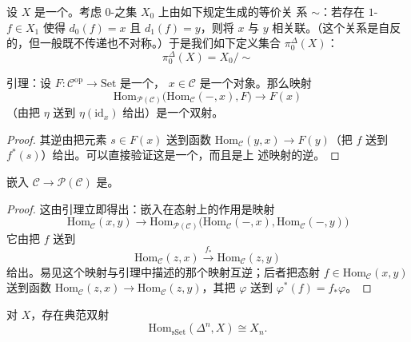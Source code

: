 \begin{definition}\label{def:pi0}
设 $X$ 是一个\trSimplicialSet{}。考虑 $0$-\trSimplex{}之集 $X_0$ 上由如下规定生成的等价关
系 $\sim$：若存在 $1$-\trSimplex{} $f \in X_1$ 使得 $d_0(f) = x$ 且 $d_1(f) = y$，则将 $x$
与 $y$ 相关联。（这个关系是自反的，但一般既不传递也不对称。）于是我们如下定义集合
$\pi^{\Delta}_0(X)$：
\[
\pi^{\Delta}_0(X) = X_0 / {\sim}
\]
\end{definition}

\begin{lemma}\label{lem:yoneda-lemma}
\trYoneda{}引理：设 $F\colon \mathcal{C}^{\mathrm{op}} \to \mathrm{Set}$ 是一个\trFunctor{}，
$x \in \mathcal{C}$ 是一个对象。那么映射
\[
\mathrm{Hom}_{\mathcal{P}(\mathcal{C})}\bigl(\mathrm{Hom}_{\mathcal{C}}(-,x),
F\bigr) \to F(x)
\]
（由把 $\eta$ 送到 $\eta(\mathrm{id}_x)$ 给出）是一个双射。
\end{lemma}
\begin{proof}
其逆由把元素 $s \in F(x)$ 送到函数 $\mathrm{Hom}_{\mathcal{C}}(y,x) \to F(y)$（把
$f$ 送到 $f^*(s)$）给出。可以直接验证这是一个\trNaturalTransformation{}，而且是上
述映射的逆。
\end{proof}

\begin{lemma}\label{lem:yoneda-embedding-fully-faithful}
\trYoneda{}嵌入 $\mathcal{C} \to \mathcal{P}(\mathcal{C})$ 是\trFullyFaithful{}。
\end{lemma}

\begin{proof}
这由\trYoneda{}引理立即得出：\trYoneda{}嵌入在态射上的作用是映射
\[
\mathrm{Hom}_{\mathcal{C}}(x,y) \to
\mathrm{Hom}_{\mathcal{P}(\mathcal{C})}\bigl(\mathrm{Hom}_{\mathcal{C}}(-,x),
\mathrm{Hom}_{\mathcal{C}}(-,y)\bigr)
\]
它由把 $f$ 送到
\[
\mathrm{Hom}_{\mathcal{C}}(z,x) \xrightarrow{\ f_*\ }
\mathrm{Hom}_{\mathcal{C}}(z,y)
\]
给出。易见这个映射与\trYoneda{}引理中描述的那个映射互逆；后者把态射
$f \in \mathrm{Hom}_{\mathcal{C}}(x,y)$ 送到函数 $\mathrm{Hom}_{\mathcal{C}}(z,x) \to \mathrm{Hom}_{\mathcal{C}}(z,y)$，其把 $\varphi$ 送到 $\varphi^*(f) = f_*\varphi$。
\end{proof}

\begin{corollary}\label{cor:hom-delta-n-x}
对\trSimplicialSet{} $X$，存在典范双射
\[
\mathrm{Hom}_{\mathrm{sSet}}(\Delta^n, X) \cong X_n.
\]
\end{corollary}


